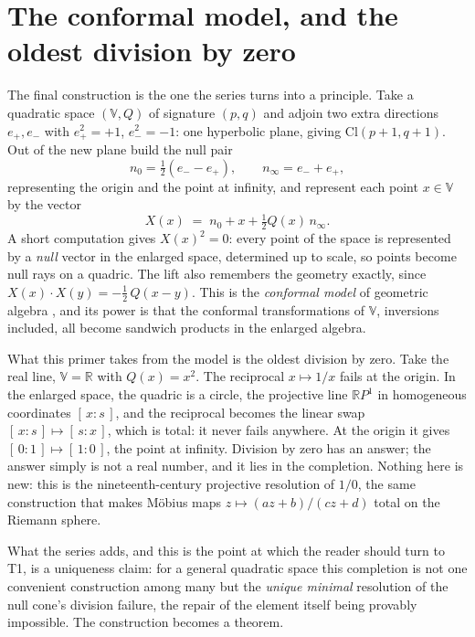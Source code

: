 \documentclass[11pt]{article}
\theoremstyle{definition}
\theoremstyle{plain}
\providecommand{\Cl}{}\renewcommand{\Cl}{\mathrm{Cl}}
\providecommand{\R}{}\renewcommand{\R}{\mathbb{R}}
\begin{document}
\section{The conformal model, and the oldest division by zero}

\label{c:note.primer.setting-conformal-model-oldest-division-zero}
The final construction is the one the series turns into a principle. Take a quadratic space $(\mathbb{V}, Q)$ of signature $(p,q)$ and adjoin two extra directions $e_+, e_-$ with $e_+^{2} = +1$, $e_-^{2} = -1$: one hyperbolic plane, giving $\Cl(p{+}1, q{+}1)$. Out of the new plane build the null pair
\[
n_0 = \tfrac12(e_- - e_+), \qquad n_\infty = e_- + e_+ ,
\]
representing the origin and the point at infinity, and represent each point $x \in \mathbb{V}$ by the vector
\[
X(x) \;=\; n_0 + x + \tfrac12 Q(x)\, n_\infty .
\]
A short computation gives $X(x)^{2} = 0$: every point of the space is represented by a \emph{null} vector in the enlarged space, determined up to scale, so points become null rays on a quadric. The lift also remembers the geometry exactly, since $X(x) \cdot X(y) = -\tfrac12\,Q(x - y)$. This is the \emph{conformal model} of geometric algebra \cite{Hestenes2001, DFM2007, DoranLasenby2003}, and its power is that the conformal transformations of $\mathbb{V}$, inversions included, all become sandwich products in the enlarged algebra.

What this primer takes from the model is the oldest division by zero. Take the real line, $\mathbb{V} = \R$ with $Q(x) = x^{2}$. The reciprocal $x \mapsto 1/x$ fails at the origin. In the enlarged space, the quadric is a circle, the projective line $\R P^{1}$ in homogeneous coordinates $[\,x : s\,]$, and the reciprocal becomes the linear swap $[\,x : s\,] \mapsto [\,s : x\,]$, which is total: it never fails anywhere. At the origin it gives $[\,0 : 1\,] \mapsto [\,1 : 0\,]$, the point at infinity. Division by zero has an answer; the answer simply is not a real number, and it lies in the completion. Nothing here is new: this is the nineteenth-century projective resolution of $1/0$, the same construction that makes M\"obius maps $z \mapsto (az+b)/(cz+d)$ total on the Riemann sphere.

What the series adds, and this is the point at which the reader should turn to T1, is a uniqueness claim: for a general quadratic space this completion is not one convenient construction among many but the \emph{unique minimal} resolution of the null cone's division failure, the repair of the element itself being provably impossible. The construction becomes a theorem.
\end{document}
